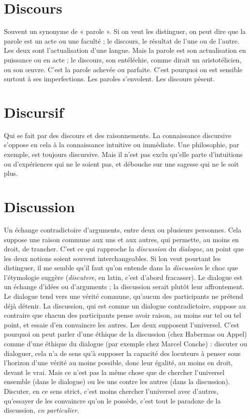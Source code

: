 \section{Discours}
Souvent un synonyme de « parole ». Si on veut les distinguer,
on peut dire que la parole est un acte ou une faculté ; le discours,
le résultat de l’une ou de l’autre. Les deux sont l’actualisation d’une
langue. Mais la parole est son actualisation en puissance ou en acte ; le discours,
son entéléchie, comme dirait un aristotélicien, ou son œuvre. C’est la parole
achevée ou parfaite. C’est pourquoi on est sensible surtout à ses imperfections.
Les paroles s’envolent. Les discours pèsent.

\section{Discursif}
Qui se fait par des discours et des raisonnements. La connaissance
discursive s'oppose en cela à la connaissance intuitive ou
immédiate. Une philosophie, par exemple, est toujours discursive. Mais il n’est
pas exclu qu’elle parte d’intuitions ou d’expériences qui ne le soient pas, et
débouche sur une sagesse qui ne le soit plus.

\section{Discussion}
Un échange contradictoire d'arguments, entre deux ou plusieurs
personnes. Cela suppose une raison commune aux uns
et aux autres, qui permette, au moins en droit, de trancher. C’est ce qui rapproche
la {\it discussion} du {\it dialogue}, au point que les deux notions soient souvent
interchangeables. Si lon veut pourtant les distinguer, il me semble qu’il faut
qu'on entende dans la {\it discussion} le choc que l’étymologie suggère ({\it discutere}, en
latin, c’est d’abord fracasser). Le dialogue est un échange d’idées ou d’arguments ;
la discussion serait plutôt leur affrontement. Le dialogue tend vers une vérité
commune, qu'aucun des participants ne prétend déjà détenir. La discussion, qui
est comme un dialogue contradictoire, suppose au contraire que chacun des participants
pense avoir raison, au moins sur tel ou tel point, et essaie d’en
convaincre les autres. Les deux supposent l’universel. C’est pourquoi on peut
parler d’une éthique de la discussion (chez Habermas ou Appel) comme d’une
éthique du dialogue (par exemple chez Marcel Conche) : discuter ou dialoguer,
cela n’a de sens qu’à supposer la capacité des locuteurs à penser sous l'horizon
d’une vérité au moins possible, donc leur égalité, au moins en droit, devant le
vrai. Mais ce n’est pas la même chose que de chercher l’universel ensemble (dans
le dialogue) ou les uns contre les autres (dans la discussion). Discuter, en ce sens
strict, c'est moins chercher l’universel avec d’autres, qu’essayer de les convaincre
qu’on le possède, c’est tout le paradoxe de la discussion, {\it en particulier}.

